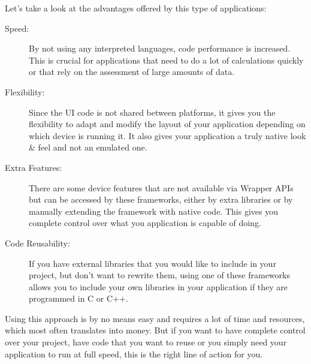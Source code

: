 Let's take a look at the advantages offered by this type of applications:

\begin{description}

\item[Speed:] By not using any interpreted languages, code performance is increased. This is crucial for applications that need to do a lot of calculations quickly or that rely on the assessment of large amounts of data.

\item[Flexibility:] Since the \ac{UI} code is not shared between platforms, it gives you the flexibility to adapt and modify the layout of your application depending on which device is running it. It also gives your application a truly native look \& feel and not an emulated one.

\item[Extra Features:] There are some device features that are not available via Wrapper \ac{API}s but can be accessed by these frameworks, either by extra libraries or by manually extending the framework with native code. This gives you complete control over what you application is capable of doing.
 
\item[Code Reusability:] If you have external libraries that you would like to include in your project, but don't want to rewrite them, using one of these frameworks allows you to include your own libraries in your application if they are programmed in C or C++. 

\end{description}

Using this approach is by no means easy and requires a lot of time and resources, which most often translates into money. But if you want to have complete control over your project, have code that you want to reuse or you simply need your application to run at full speed, this is the right line of action for you.